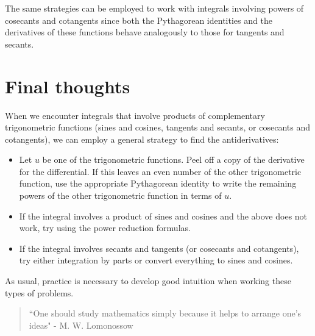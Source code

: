 \documentclass{ximera}
\begin{document}
\begin{remark}
The same strategies can be employed to work with integrals involving powers of cosecants and cotangents since both the Pythagorean identities and the derivatives of these functions behave analogously to those for tangents and secants.
\end{remark}


\section{Final thoughts}

When we encounter integrals that involve products of complementary trigonometric functions (sines and cosines, tangents and secants, or cosecants and cotangents), we can employ a general strategy to find the antiderivatives:

\begin{itemize}
\item Let $u$ be one of the trigonometric functions.  Peel off a copy of the derivative for the differential.  If this leaves an even number of the other trigonometric function, use the appropriate Pythagorean identity to write the remaining powers of the other trigonometric function in terms of $u$.  
\item If the integral involves a product of sines and cosines and the above does not work, try using the power reduction formulas.
\item If the integral involves secants and tangents (or cosecants and cotangents), try either integration by parts or convert everything to sines and cosines.
\end{itemize}

As usual, practice is necessary to develop good intuition when working these types of problems.

\begin{quote}
``One should study mathematics simply because it helps to arrange one's ideas" - M. W. Lomonossow
\end{quote}
\end{document}
